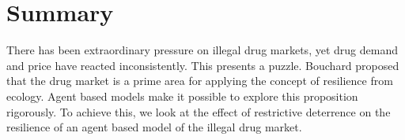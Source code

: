 \documentclass[runningheads,a4paper]{llncs}
\begin{document}
\section{Summary}

There has been extraordinary pressure on illegal drug markets, yet drug demand and price have reacted inconsistently. This presents a puzzle. Bouchard \cite{bouchard_resilience_2007} proposed that the drug market is a prime area for applying the concept of resilience from ecology. Agent based models make it possible to explore this proposition rigorously. To achieve this, we look at the effect of restrictive deterrence on the resilience of an agent based model of the illegal drug market.


{}



\end{document}
